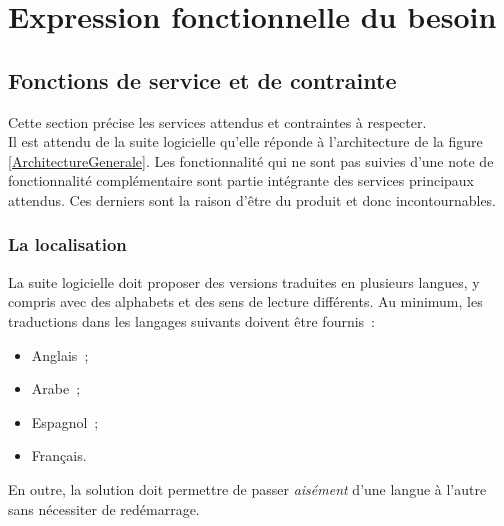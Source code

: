 \chapter{Expression fonctionnelle du besoin}

\section{Fonctions de service et de contrainte}
Cette section précise les services attendus et contraintes à respecter.
\\
Il est attendu de la suite logicielle qu'elle réponde à l'architecture de la figure \ref{ArchitectureGenerale}. Les fonctionnalité qui ne sont pas suivies d'une note de fonctionnalité complémentaire sont partie intégrante des services principaux attendus. Ces derniers sont la raison d'être du produit et donc incontournables.

\subsection{La localisation}
La suite logicielle doit proposer des versions traduites en plusieurs langues, y compris avec des alphabets et des sens de lecture différents. Au minimum, les traductions dans les langages suivants doivent être fournis~:
\begin{itemize}
	\item Anglais~;
	\item Arabe~;
	\item Espagnol~;
	\item Français.
\end{itemize}
En outre, la solution doit permettre de passer \emph{aisément} d'une langue à l'autre sans nécessiter de redémarrage.

